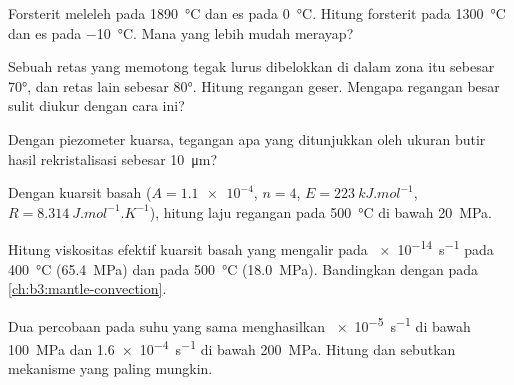 \begin{exercise}[$\star$]\label{exo:b3:deformation-mechanisms:1}
Forsterit meleleh pada \qty{1890}{\celsius} dan es pada \qty{0}{\celsius}. Hitung
 forsterit pada \qty{1300}{\celsius} dan es pada
\qty{-10}{\celsius}. Mana yang lebih mudah merayap?
\end{exercise}

\begin{exercise}[$\star$]\label{exo:b3:deformation-mechanisms:2}
Sebuah retas yang memotong  tegak lurus dibelokkan di dalam zona itu
sebesar \ang{70}, dan retas lain sebesar \ang{80}. Hitung regangan geser. Mengapa
regangan besar sulit diukur dengan cara ini?
\end{exercise}

\begin{exercise}[$\star$]\label{exo:b3:deformation-mechanisms:3}
Dengan piezometer kuarsa, tegangan apa yang ditunjukkan oleh ukuran butir hasil
rekristalisasi sebesar \qty{10}{\micro m}?
\end{exercise}

\begin{exercise}[$\star$]\label{exo:b3:deformation-mechanisms:4}
Dengan  kuarsit basah ($A = \num{1.1e-4}$, $n = 4$, $E =
\qty{223}{kJ.mol^{-1}}$, $R = \qty{8.314}{J.mol^{-1}.K^{-1}}$), hitung
laju regangan pada \qty{500}{\celsius} di bawah \qty{20}{MPa}.
\end{exercise}

\begin{exercise}[$\star\star$]\label{exo:b3:deformation-mechanisms:5}
Hitung viskositas efektif kuarsit basah yang mengalir pada \qty{e-14}{s^{-1}}
pada \qty{400}{\celsius} (\qty{65.4}{MPa}) dan pada \qty{500}{\celsius}
(\qty{18.0}{MPa}). Bandingkan dengan  pada
\cref{ch:b3:mantle-convection}.
\end{exercise}

\begin{exercise}[$\star\star$]\label{exo:b3:deformation-mechanisms:6}
Dua percobaan pada suhu yang sama menghasilkan \qty{e-5}{s^{-1}} di bawah
\qty{100}{MPa} dan \qty{1.6e-4}{s^{-1}} di bawah \qty{200}{MPa}. Hitung 
dan sebutkan mekanisme yang paling mungkin.
\end{exercise}

